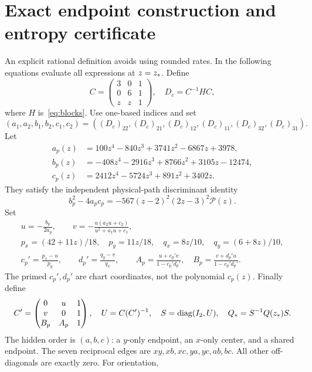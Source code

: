 \section{Exact endpoint construction and entropy certificate}\label{app:certificate}
An explicit rational definition avoids using rounded rates. In the following equations evaluate all expressions at $z=z_*$. Define
\begin{equation}
 C=\begin{pmatrix}3&0&1\\0&6&1\\z&z&1\end{pmatrix},\quad D_c=C^{-1}HC,
\end{equation}
where $H$ is~\eqref{eq:blocks}. Use one-based indices and set
\begin{equation}
 (a_1,a_2,b_1,b_2,c_1,c_2)
 =((D_c)_{22},(D_c)_{21},(D_c)_{12},(D_c)_{11},(D_c)_{32},(D_c)_{31}).
\end{equation}
Let
\begin{align}
 a_p(z)&=100z^4-840z^3+3741z^2-6867z+3978,\\
 b_p(z)&=-408z^4-2916z^3+8766z^2+3105z-12474,\\
 c_p(z)&=2412z^4-5724z^3+891z^2+3402z.
\end{align}
They satisfy the independent physical-path discriminant identity
\begin{equation}
 b_p^2-4a_pc_p=-567(z-2)^2(2z-3)^2\mathcal P(z).\label{eq:pathdisc}
\end{equation}
Set
\begin{gather}
 u=-\frac{b_p}{2a_p},\qquad v=-\frac{u(a_2u+c_2)}{u^2+a_1u+c_1},\\
 p_x=(42+11z)/18,\quad p_y=11z/18,\quad
 q_x=8z/10,\quad q_y=(6+8z)/10,\\
 c_p'=\frac{p_x-u}{p_y},\qquad d_p'=\frac{q_y-v}{q_x},\qquad
 A_p=\frac{u+c_p'v}{1-c_p'd_p'},\quad
 B_p=\frac{v+d_p'u}{1-c_p'd_p'}.\label{eq:pathcoordinates}
\end{gather}
The primed $c_p',d_p'$ are chart coordinates, not the polynomial $c_p(z)$. Finally define
\begin{equation}
 C'=\begin{pmatrix}0&u&1\\v&0&1\\B_p&A_p&1\end{pmatrix},\quad
 U=C(C')^{-1},\quad S=\operatorname{diag}(I_2,U),\quad Q_*=S^{-1}Q(z_*)S.\label{eq:target}
\end{equation}
The hidden order is $(a,b,c)$: a $y$-only endpoint, an $x$-only center, and a shared endpoint. The seven reciprocal edges are $xy,xb,xc,ya,yc,ab,bc$. All other off-diagonals are exactly zero. For orientation,
